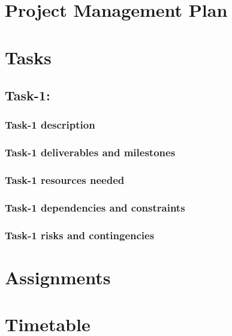 \documentclass{article}[12pt]
\begin{document}
\section{Project Management Plan} \label{s:intro}

\section{Tasks} \label{s:intro}

\subsection{Task-1: } \label{s:intro}
\subsubsection{Task-1 description} \label{s:intro}
\subsubsection{Task-1 deliverables and milestones} \label{s:intro}
\subsubsection{Task-1 resources needed} \label{s:intro}
\subsubsection{Task-1 dependencies and constraints} \label{s:intro}
\subsubsection{Task-1 risks and contingencies} \label{s:intro}

\section{Assignments} \label{s:intro}
\section{Timetable} \label{s:intro}
\end{document}
